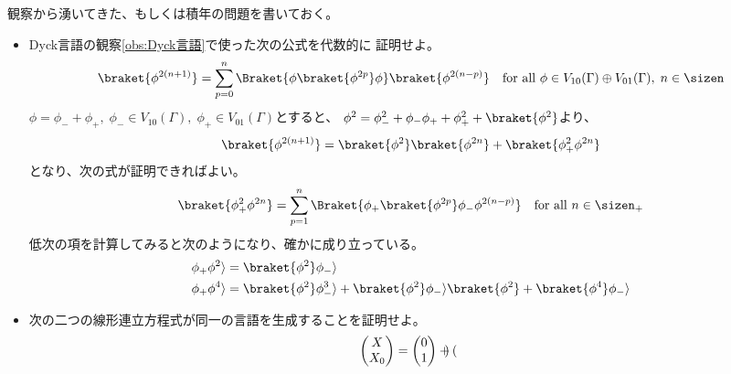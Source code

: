 {	\begin{todo}[湧いてきた問題]\label{todo:湧いてきた問題} %
		観察から湧いてきた、もしくは積年の問題を書いておく。
		\begin{itemize}\setlength{\itemsep}{-1mm} %
			\item Dyck言語の観察\ref{obs:Dyck言語}で使った次の公式を代数的に
			証明せよ。
			\begin{equation*}\begin{split}
				\braket{\phi^{2(n+1)}} = \sum_{p=0}^n
				\Braket{\phi\braket{\phi^{2p}}\phi}\braket{\phi^{2(n-p)}}
				\quad\text{for all } \phi\in V_{10}(\Gamma)\oplus V_{01}(\Gamma)
				,\; n\in\sizen
			\end{split}\end{equation*}
			$\phi=\phi_-+\phi_+
			,\;\phi_-\in V_{10}(\Gamma)
			,\;\phi_+\in V_{01}(\Gamma)$とすると、
			$\phi^2=\phi_-^2+\phi_-\phi_++\phi_+^2+\braket{\phi^2}$より、
			\begin{equation*}\begin{split}
				\braket{\phi^{2(n+1)}} = \braket{\phi^2}\braket{\phi^{2n}}
					+ \braket{\phi_+^2\phi^{2n}} \\
			\end{split}\end{equation*}
			となり、次の式が証明できればよい。
			\begin{equation}\label{eq:証明したい式その一}\begin{split}
				\braket{\phi_+^2\phi^{2n}}
				= \sum_{p=1}^n \Braket{\phi_+\braket{\phi^{2p}}\phi_-\phi^{2(n-p)}}
				\quad\text{for all } n\in\sizen_+
			\end{split}\end{equation}
			低次の項を計算してみると次のようになり、確かに成り立っている。
			\begin{equation*}\begin{split}
				\phi_+\phi^2\rangle &= \braket{\phi^2}\phi_-\rangle \\
				\phi_+\phi^4\rangle &= \braket{\phi^2}\phi_-^3\rangle
				+ \braket{\phi^2}\phi_-\rangle\braket{\phi^2}
				+ \braket{\phi^4}\phi_-\rangle \\
			\end{split}\end{equation*}
			\item 次の二つの線形連立方程式が同一の言語を生成することを証明せよ。
			\begin{equation*}\begin{split}
				\begin{pmatrix}{X}\\{X_0}\end{pmatrix} &= \begin{pmatrix}{0}\\{1}\end{pmatrix} + \begin{pmatrix}

\end{pmatrix}
\end{split}
\end{equation*}
\end{itemize}
\end{todo}}
